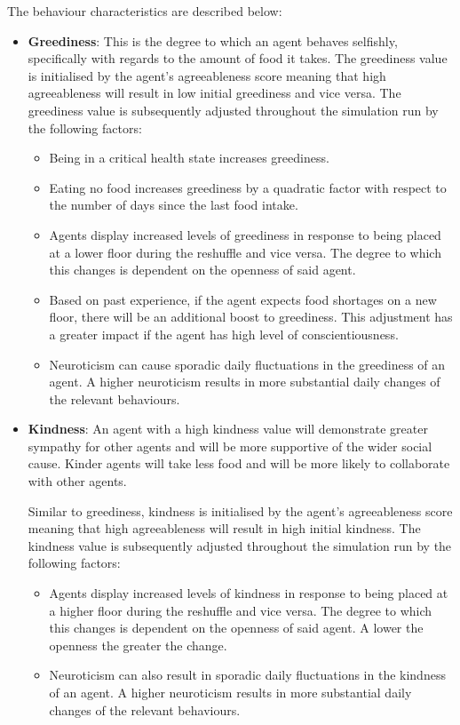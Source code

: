 The behaviour characteristics are described below:
\begin{itemize}
    \item  \textbf{Greediness}: This is the degree to which an agent behaves selfishly, specifically with regards to the amount of food it takes. The greediness value is initialised by the agent's agreeableness score meaning that high agreeableness will result in low initial greediness and vice versa. The greediness value is subsequently adjusted throughout the simulation run by the following factors: 
    
    \begin{itemize}
        \item Being in a critical health state increases greediness.
        \item Eating no food increases greediness by a quadratic factor with respect to the number of days since the last food intake.
        \item Agents display increased levels of greediness in response to being placed at a lower floor during the reshuffle and vice versa. The degree to which this changes is dependent on the openness of said agent.  
        \item Based on past experience, if the agent expects food shortages on a new floor, there will be an additional boost to greediness. This adjustment has a greater impact if the agent has high level of conscientiousness.
        \item Neuroticism can cause sporadic daily fluctuations in the greediness of an agent. A higher neuroticism results in more substantial daily changes of the relevant behaviours.
    \end{itemize}
    
    \item  \textbf{Kindness}: An agent with a high kindness value will demonstrate greater sympathy for other agents and will be more supportive of the wider social cause. Kinder agents will take less food and will be more likely to collaborate with other agents. 
    
    Similar to greediness, kindness is initialised by the agent's agreeableness score meaning that high agreeableness will result in high initial kindness. The kindness value is subsequently adjusted throughout the simulation run by the following factors:
    
    \begin{itemize}
        \item Agents display increased levels of kindness in response to being placed at a higher floor during the reshuffle and vice versa. The degree to which this changes is dependent on the openness of said agent. A lower the openness the greater the change.
        \item Neuroticism can also result in sporadic daily fluctuations in the kindness of an agent. A higher neuroticism results in more substantial daily changes of the relevant behaviours. 
    \end{itemize}
    

\end{itemize}
